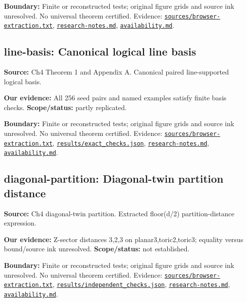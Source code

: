 \documentclass[11pt]{article}
\begin{document}
\textbf{Boundary:} Finite or reconstructed tests; original figure grids and source ink unresolved. No universal theorem certified. Evidence: \href{https://github.com/alectionary/vibe-math/blob/master/formalization/quintavalle-hgp/sources/browser-extraction.txt}{\nolinkurl{sources/browser-extraction.txt}}, \href{https://github.com/alectionary/vibe-math/blob/master/formalization/quintavalle-hgp/research-notes.md}{\nolinkurl{research-notes.md}}, \href{https://github.com/alectionary/vibe-math/blob/master/formalization/quintavalle-hgp/availability.md}{\nolinkurl{availability.md}}.
\subsection{line-basis: Canonical logical line basis}
\label{claim:line-basis}
\textbf{Source:} Ch4 Theorem 1 and Appendix A. Canonical paired line-supported logical basis.

\textbf{Our evidence:} All 256 seed pairs and named examples satisfy finite basis checks. \textbf{Scope/status:} partly replicated.

\textbf{Boundary:} Finite or reconstructed tests; original figure grids and source ink unresolved. No universal theorem certified. Evidence: \href{https://github.com/alectionary/vibe-math/blob/master/formalization/quintavalle-hgp/sources/browser-extraction.txt}{\nolinkurl{sources/browser-extraction.txt}}, \href{https://github.com/alectionary/vibe-math/blob/master/formalization/quintavalle-hgp/results/exact_checks.json}{\nolinkurl{results/exact_checks.json}}, \href{https://github.com/alectionary/vibe-math/blob/master/formalization/quintavalle-hgp/research-notes.md}{\nolinkurl{research-notes.md}}, \href{https://github.com/alectionary/vibe-math/blob/master/formalization/quintavalle-hgp/availability.md}{\nolinkurl{availability.md}}.
\subsection{diagonal-partition: Diagonal-twin partition distance}
\label{claim:diagonal-partition}
\textbf{Source:} Ch4 diagonal-twin partition. Extracted floor(d/2) partition-distance expression.

\textbf{Our evidence:} Z-sector distances 3,2,3 on planar3,toric2,toric3; equality versus bound/source ink unresolved. \textbf{Scope/status:} not established.

\textbf{Boundary:} Finite or reconstructed tests; original figure grids and source ink unresolved. No universal theorem certified. Evidence: \href{https://github.com/alectionary/vibe-math/blob/master/formalization/quintavalle-hgp/sources/browser-extraction.txt}{\nolinkurl{sources/browser-extraction.txt}}, \href{https://github.com/alectionary/vibe-math/blob/master/formalization/quintavalle-hgp/results/independent_checks.json}{\nolinkurl{results/independent_checks.json}}, \href{https://github.com/alectionary/vibe-math/blob/master/formalization/quintavalle-hgp/research-notes.md}{\nolinkurl{research-notes.md}}, \href{https://github.com/alectionary/vibe-math/blob/master/formalization/quintavalle-hgp/availability.md}{\nolinkurl{availability.md}}.
\end{document}
